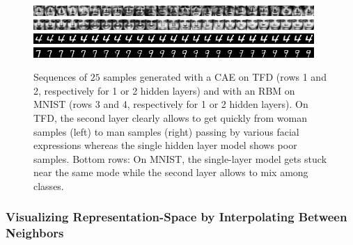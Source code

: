 \begin{figure}
\vspace*{-3mm}
\begin{center}
    \includegraphics[width=0.95\textwidth]{article3/images/cae1tfd_seq4_data_image_noncen.png}
    \includegraphics[width=0.95\textwidth]{article3/images/cae2tfd_seq6_data_image_noncen.png}
    \includegraphics[width=0.95\textwidth]{article3/images/rbm1mnist_seq3_data_image_noncen.png}
    \includegraphics[width=0.95\textwidth]{article3/images/rbm2mnist_seq17_data_image_noncen.png}
\end{center}
\vspace*{-3mm}
\caption{Sequences of $25$ samples generated with a CAE
on TFD (rows 1 and 2, respectively for 1 or 2 hidden layers) 
and with an RBM on MNIST (rows 3 and 4, respectively for 1 or
2 hidden layers). 
{\small On TFD, the second layer clearly allows to get
quickly from woman samples (left) to man samples (right) passing by various facial
expressions whereas the single hidden layer model shows poor samples.
Bottom rows: On MNIST, the single-layer model gets stuck
near the same mode while the second layer allows to mix among classes.}  }

\label{fig:seq}
\vspace*{-3mm}
\end{figure}


\vspace*{-1mm}
\subsubsection{Visualizing Representation-Space by Interpolating Between Neighbors}
\vspace*{-1mm}

